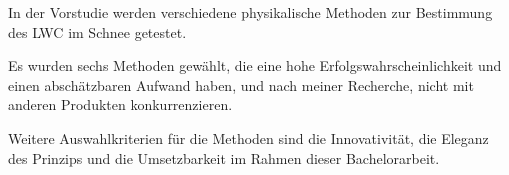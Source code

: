 
In der Vorstudie werden verschiedene physikalische Methoden zur Bestimmung des LWC im Schnee getestet.

Es wurden sechs Methoden gewählt, die eine hohe Erfolgswahrscheinlichkeit und einen abschätzbaren Aufwand haben, und nach meiner Recherche, nicht mit anderen Produkten konkurrenzieren.

Weitere Auswahlkriterien für die Methoden sind die Innovativität, die Eleganz des Prinzips und die Umsetzbarkeit im Rahmen dieser Bachelorarbeit.

